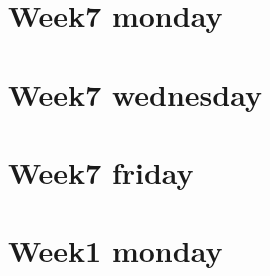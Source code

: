 
\section*{Week7 monday}

\vfill
\section*{Week7 wednesday}

\vfill
\section*{Week7 friday}

\vfill
\section*{Week1 monday}

\vfill
